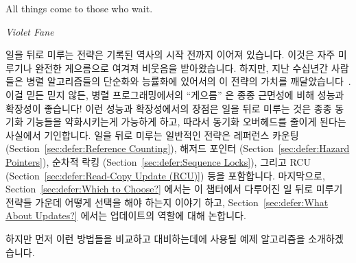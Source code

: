 

\epigraph{All things come to those who wait.}{\emph{Violet Fane}}

일을 뒤로 미루는 전략은 기록된 역사의 시작 전까지 이어져 있습니다.
이것은 자주 미루기나 완전한 게으름으로 여겨져 비웃음을 받아왔습니다.
하지만, 지난 수십년간 사람들은 병렬 알고리즘들의 단순화와 능률화에 있어서의 이
전략의 가치를 깨달았습니다~\cite{Kung80,HMassalinPhD}.
이걸 믿든 믿지 않든, 병렬 프로그래밍에서의 ``게으름'' 은 종종 근면성에 비해
성능과 확장성이 좋습니다!
이런 성능과 확장성에서의 장점은 일을 뒤로 미루는 것은 종종 동기화 기능들을
약화시키는게 가능하게 하고, 따라서 동기화 오버헤드를 줄이게 된다는 사실에서
기인합니다.
일을 뒤로 미루는 일반적인 전략은
레퍼런스 카운팅 (Section~\ref{sec:defer:Reference Counting}),
해저드 포인터 (Section~\ref{sec:defer:Hazard Pointers}),
순차적 락킹 (Section~\ref{sec:defer:Sequence Locks}),
그리고 RCU (Section~\ref{sec:defer:Read-Copy Update (RCU)}) 등을 포함합니다.
마지막으로, Section~\ref{sec:defer:Which to Choose?}
에서는 이 챕터에서 다루어진 일 뒤로 미루기 전략들 가운데 어떻게 선택을 해야
하는지 이야기 하고, 
Section~\ref{sec:defer:What About Updates?} 에서는 업데이트의 역할에 대해
논합니다.

하지만 먼저 이런 방법들을 비교하고 대비하는데에 사용될 예제 알고리즘을
소개하겠습니다.
\iffalse

